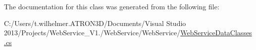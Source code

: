 

The documentation for this class was generated from the following file\+:\begin{DoxyCompactItemize}
\item 
C\+:/\+Users/t.\+wilhelmer.\+A\+T\+R\+O\+N3\+D/\+Documents/\+Visual Studio 2013/\+Projects/\+Web\+Service\+\_\+\+V1./\+Web\+Service/\+Web\+Service/\hyperlink{_web_service_data_classes_8cs}{Web\+Service\+Data\+Classes.\+cs}\end{DoxyCompactItemize}
